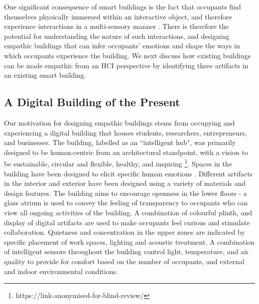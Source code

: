 \documentclass [sigconf, review, anonymous] {acmart}
\begin{document}

\label{sec:empathic-buildings}
One significant consequence of smart buildings is the fact that occupants find themselves physically immersed within an interactive object, and therefore experience interactions in a multi-sensory manner \cite{nembrini2017human}. There is therefore the potential for understanding the nature of such interactions, and designing empathic buildings that can infer occupants' emotions and shape the ways in which occupants experience the building. We next discuss how existing buildings can be made empathic from an HCI perspective by identifying three artifacts in an existing smart building.  
 

\subsection{A Digital Building of the Present}
\label{subsec:building}
Our motivation for designing empathic buildings stems from occupying and experiencing a digital building that houses students, researchers, entrepreneurs, and businesses. The building, labelled as an ``intelligent hub", was primarily designed to be human-centric from an architectural standpoint, with a vision to be sustainable, circular and flexible, healthy, and inspiring \footnote{https://link-anonymised-for-blind-review/}. Spaces in the building have been designed to elicit specific human emotions \cite{silo_michiel_2022}. Different artifacts in the interior and exterior have been designed using a variety of materials and design features. The building aims to encourage openness in the lower floors - a glass atrium is used to convey the feeling of transparency to occupants who can view all ongoing activities of the building. A combination of colourful plinth, and display of digital artifacts are used to make occupants feel curious and stimulate collaboration. Quietness and concentration in the upper zones are indicated by specific placement of work spaces, lighting and acoustic treatment. A combination of intelligent sensors throughout the building control light, temperature, and air quality to provide for comfort based on the number of occupants, and external and indoor environmental conditions. 
\end{document}
